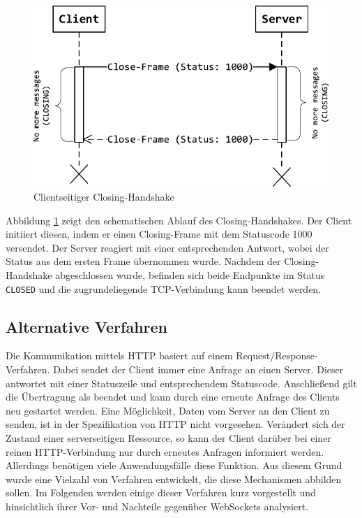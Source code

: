 \documentclass[11pt,a4paper,titlepage]{scrartcl}
\numberwithin{equation}{section}
\begin{document}
\begin{figure}[ht] 
	\begin{center}
		\includegraphics[scale=1]{img/closehandshake.pdf}
		\caption{Clientseitiger Closing-Handshake}
		\label{fig:wsClosingHandshake}
	\end{center}
\end{figure}

\noindent Abbildung \ref{fig:wsClosingHandshake} zeigt den schematischen Ablauf des Closing-Handshakes. Der Client initiiert diesen, indem er einen Closing-Frame mit dem Statuscode 1000 versendet. Der Server reagiert mit einer entsprechenden Antwort, wobei der Status aus dem ersten Frame übernommen wurde. Nachdem der Closing-Handshake abgeschlossen wurde, befinden sich beide Endpunkte im Status \texttt{CLOSED} und die zugrundeliegende TCP-Verbindung kann beendet werden.

\subsection{Alternative Verfahren}\label{subsubsec:AlternativeVerfahren}
Die Kommunikation mittels HTTP basiert auf einem Request/Response-Verfahren. Dabei sendet der Client immer eine Anfrage an einen Server. Dieser antwortet mit einer Statuszeile und entsprechendem Statuscode. Anschließend gilt die Übertragung als beendet und kann durch eine erneute Anfrage des Clients neu gestartet werden. Eine Möglichkeit, Daten vom Server an den Client zu senden, ist in der Spezifikation von HTTP nicht vorgesehen. Verändert sich der Zustand einer serverseitigen Ressource, so kann der Client darüber bei einer reinen HTTP-Verbindung nur durch erneutes Anfragen informiert werden. Allerdings benötigen viele Anwendungsfälle diese Funktion. Aus diesem Grund wurde eine Vielzahl von Verfahren entwickelt, die diese Mechanismen abbilden sollen. Im Folgenden werden einige dieser Verfahren kurz vorgestellt und hinsichtlich ihrer Vor- und Nachteile gegenüber WebSockets analysiert.
\end{document}
